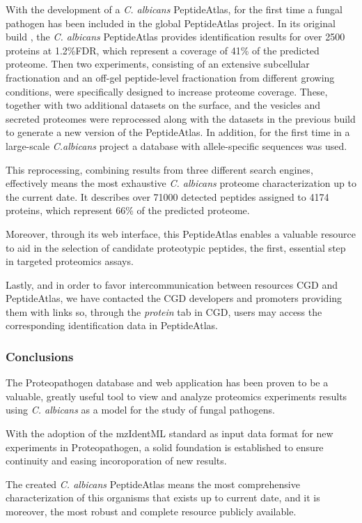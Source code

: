 With the development of a \textit{C. albicans} PeptideAtlas, for the
first time a fungal pathogen has been included in the global PeptideAtlas project.
In its original build \citep{Vialas2013}, the \textit{C. albicans} PeptideAtlas provides identification
results for over 2500 proteins at 1.2\%FDR, which represent a coverage of 41\% of
the predicted proteome. Then two 
experiments, consisting of an extensive subcellular fractionation and an off-gel
peptide-level fractionation from different growing conditions, were specifically
designed to increase proteome coverage. These, together with two additional datasets
on the surface, and the vesicles and secreted proteomes were reprocessed along with
the datasets in the previous build to generate a new version of the PeptideAtlas.
In addition, for the first time in a large-scale \textit{C.albicans} project
a database with allele-specific sequences was used. 

This reprocessing, combining results from three different search engines,
effectively means the most exhaustive \textit{C. albicans}
proteome characterization up to the current date.
It describes over 71000 detected peptides assigned to 4174 proteins, which
represent 66\% of the predicted proteome. 

Moreover, through its web interface, this PeptideAtlas enables a valuable
resource to aid in the selection of candidate proteotypic peptides, the
first, essential step in targeted proteomics assays.

Lastly, and in order to favor intercommunication between resources CGD and
PeptideAtlas, we have contacted the CGD developers and promoters providing 
them with links so, through the \textit{protein} tab in CGD, users
may access the corresponding identification data in PeptideAtlas.




\subsubsection*{Conclusions}

The Proteopathogen database and web application has been proven to be a
valuable, greatly useful tool to view and analyze proteomics experiments 
results using \textit{C. albicans} as a model for the study of fungal pathogens.

With the adoption of the mzIdentML standard as input data format for new experiments
in Proteopathogen, a solid foundation is established to ensure continuity and easing
incoroporation of new results.

The created \textit{C. albicans} PeptideAtlas means the most comprehensive 
characterization of this organisms that exists up to current date, and it is
moreover, the most robust and complete resource publicly available.


\endinput

